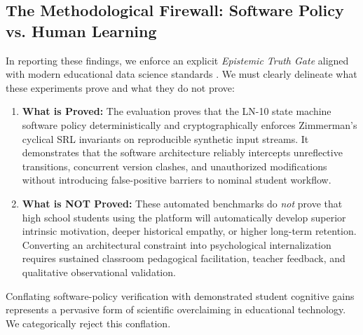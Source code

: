 \documentclass[11pt,a4paper]{article}
\begin{document}
\subsection{The Methodological Firewall: Software Policy vs. Human Learning}
In reporting these findings, we enforce an explicit \textit{Epistemic Truth Gate} aligned with modern educational data science standards \cite{baker2008gaming}. We must clearly delineate what these experiments prove and what they do not prove:

\begin{enumerate}
    \item \textbf{What is Proved:} The evaluation proves that the LN-10 state machine software policy deterministically and cryptographically enforces Zimmerman's cyclical SRL invariants on reproducible synthetic input streams. It demonstrates that the software architecture reliably intercepts unreflective transitions, concurrent version clashes, and unauthorized modifications without introducing false-positive barriers to nominal student workflow.
    \item \textbf{What is NOT Proved:} These automated benchmarks do \textit{not} prove that high school students using the platform will automatically develop superior intrinsic motivation, deeper historical empathy, or higher long-term retention. Converting an architectural constraint into psychological internalization requires sustained classroom pedagogical facilitation, teacher feedback, and qualitative observational validation.
\end{enumerate}

Conflating software-policy verification with demonstrated student cognitive gains represents a pervasive form of scientific overclaiming in educational technology. We categorically reject this conflation.
\end{document}
